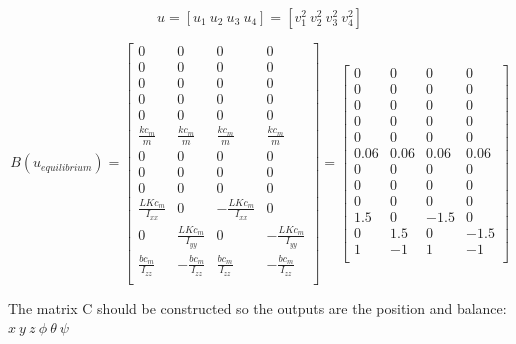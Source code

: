 $$
u = [u_1 \ u_2 \ u_3 \ u_4] = [v_1^2 \ v_2^2 \ v_3^2 \ v_4^2 ]
$$

$$
B(u_{equilibrium}) = 
\begin{bmatrix}
0 & 0 & 0 & 0 \\ %
0 & 0 & 0 & 0 \\ %
0 & 0 & 0 & 0 \\ %

0 & 0 & 0 & 0 \\ %
0 & 0 & 0 & 0 \\ %
\frac{k c_m}{m} & \frac{k c_m}{m} & \frac{k c_m}{m} & \frac{k c_m}{m} \\

0 & 0 & 0 & 0 \\
0 & 0 & 0 & 0 \\
0 & 0 & 0 & 0 \\

\frac{L K c_m }{I_{xx}} & 0 & -\frac{L K c_m }{I_{xx}} & 0 \\
0 & \frac{L K c_m }{I_{yy}} & 0 & -\frac{L K c_m }{I_{yy}} \\
\frac{b c_m }{I_{zz}} & -\frac{b c_m }{I_{zz}} & \frac{b c_m }{I_{zz}} & -\frac{b c_m }{I_{zz}}\\
\end{bmatrix}
= 
\begin{bmatrix}
0 & 0 & 0 & 0 \\ %
0 & 0 & 0 & 0 \\ %
0 & 0 & 0 & 0 \\ %

0 & 0 & 0 & 0 \\ %
0 & 0 & 0 & 0 \\ %
0.06 & 0.06 & 0.06 & 0.06 \\

0 & 0 & 0 & 0 \\
0 & 0 & 0 & 0 \\
0 & 0 & 0 & 0 \\

1.5 & 0 & -1.5 & 0 \\
0 & 1.5 & 0 & -1.5 \\
1 & -1 & 1 & -1\\
\end{bmatrix}
$$

The matrix C should be constructed so the outputs are the position and balance: $x \ y \ z   \ \phi \ \theta \ \psi$

